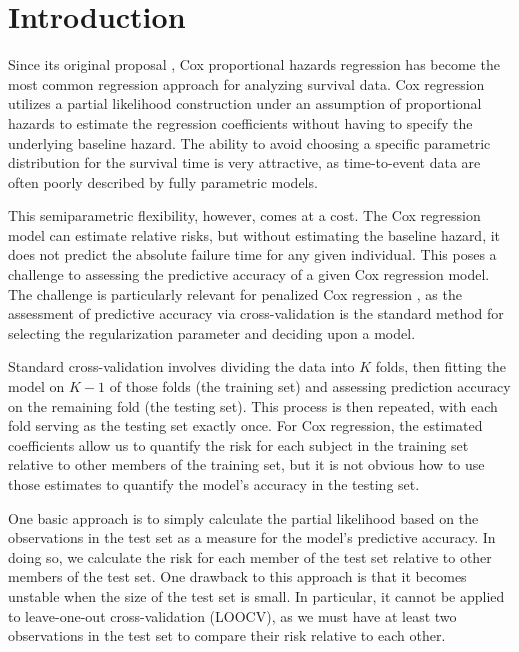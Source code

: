 \section{Introduction}

Since its original proposal \citep{Cox1972}, Cox proportional hazards regression has become the most common regression approach for analyzing survival data.  Cox regression utilizes a partial likelihood construction under an assumption of proportional hazards to estimate the regression coefficients without having to specify the underlying baseline hazard.  The ability to avoid choosing a specific parametric distribution for the survival time is very attractive, as time-to-event data are often poorly described by fully parametric models.

This semiparametric flexibility, however, comes at a cost. The Cox regression model can estimate relative risks, but without estimating the baseline hazard, it does not predict the absolute failure time for any given individual.  This poses a challenge to assessing the predictive accuracy of a given Cox regression model.  The challenge is particularly relevant for penalized Cox regression \citep{Tibshirani1997,Fan2002}, as the assessment of predictive accuracy via cross-validation is the standard method for selecting the regularization parameter and deciding upon a model.

Standard cross-validation involves dividing the data into $K$ folds, then fitting the model on $K-1$ of those folds (the training set) and assessing prediction accuracy on the remaining fold (the testing set). This process is then repeated, with each fold serving as the testing set exactly once. For Cox regression, the estimated coefficients allow us to quantify the risk for each subject in the training set relative to other members of the training set, but it is not obvious how to use those estimates to quantify the model's accuracy in the testing set.

One basic approach is to simply calculate the partial likelihood based on the observations in the test set as a measure for the model's predictive accuracy.  In doing so, we calculate the risk for each member of the test set relative to other members of the test set.  One drawback to this approach is that it becomes unstable when the size of the test set is small.  In particular, it cannot be applied to leave-one-out cross-validation (LOOCV), as we must have at least two observations in the test set to compare their risk relative to each other.

